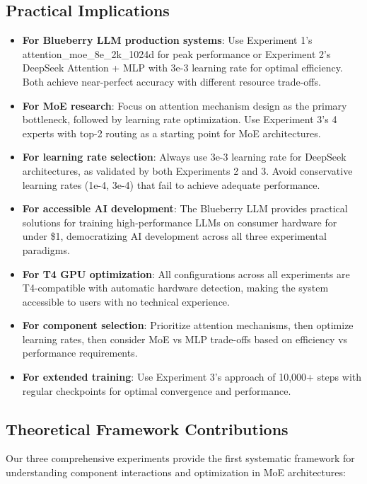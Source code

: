 \documentclass[11pt,a4paper]{article}
\begin{document}
\subsection{Practical Implications}

\begin{itemize}
    \item \textbf{For Blueberry LLM production systems}: Use Experiment 1's attention\_moe\_8e\_2k\_1024d for peak performance or Experiment 2's DeepSeek Attention + MLP with 3e-3 learning rate for optimal efficiency. Both achieve near-perfect accuracy with different resource trade-offs.
    \item \textbf{For MoE research}: Focus on attention mechanism design as the primary bottleneck, followed by learning rate optimization. Use Experiment 3's 4 experts with top-2 routing as a starting point for MoE architectures.
    \item \textbf{For learning rate selection}: Always use 3e-3 learning rate for DeepSeek architectures, as validated by both Experiments 2 and 3. Avoid conservative learning rates (1e-4, 3e-4) that fail to achieve adequate performance.
    \item \textbf{For accessible AI development}: The Blueberry LLM provides practical solutions for training high-performance LLMs on consumer hardware for under \$1, democratizing AI development across all three experimental paradigms.
    \item \textbf{For T4 GPU optimization}: All configurations across all experiments are T4-compatible with automatic hardware detection, making the system accessible to users with no technical experience.
    \item \textbf{For component selection}: Prioritize attention mechanisms, then optimize learning rates, then consider MoE vs MLP trade-offs based on efficiency vs performance requirements.
    \item \textbf{For extended training}: Use Experiment 3's approach of 10,000+ steps with regular checkpoints for optimal convergence and performance.
\end{itemize}

\subsection{Theoretical Framework Contributions}

Our three comprehensive experiments provide the first systematic framework for understanding component interactions and optimization in MoE architectures:
\end{document}
